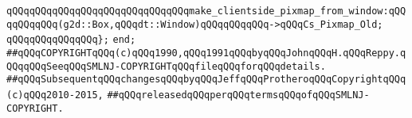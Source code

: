 \verb|qQQqqQQqqQQqqQQqqQQqqQQqqQQqqQQqmake_clientside_pixmap_from_window:qQQqqQQqqQQq(g2d::Box,qQQqdt::Window)qQQqqQQqqQQq->qQQqCs_Pixmap_Old;|\newline
\verb|qQQqqQQqqQQqqQQq};|\newline
\newline
\verb|end;|\newline
\newline
\verb|##qQQqCOPYRIGHTqQQq(c)qQQq1990,qQQq1991qQQqbyqQQqJohnqQQqH.qQQqReppy.qQQqqQQqSeeqQQqSMLNJ-COPYRIGHTqQQqfileqQQqforqQQqdetails.|\newline
\verb|##qQQqSubsequentqQQqchangesqQQqbyqQQqJeffqQQqProtheroqQQqCopyrightqQQq(c)qQQq2010-2015,|\newline
\verb|##qQQqreleasedqQQqperqQQqtermsqQQqofqQQqSMLNJ-COPYRIGHT.|\newline

